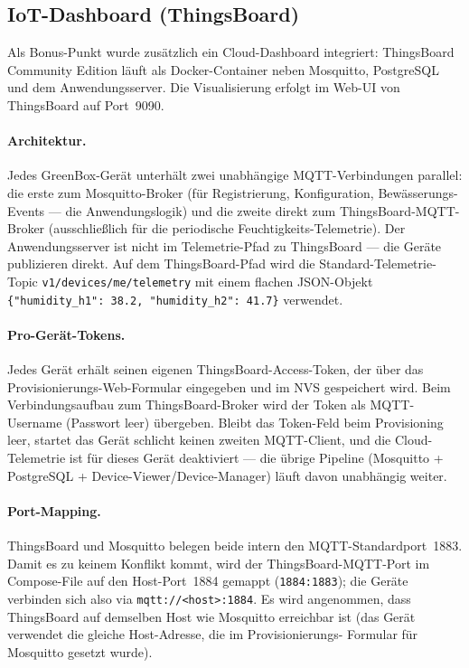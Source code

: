 \documentclass[a4paper,12pt]{article}
\begin{document}
\subsection{IoT-Dashboard (ThingsBoard)}

Als Bonus-Punkt wurde zusätzlich ein
Cloud-Dashboard integriert: ThingsBoard Community Edition läuft als
Docker-Container neben Mosquitto, PostgreSQL und dem
Anwendungsserver. Die Visualisierung erfolgt im Web-UI von
ThingsBoard auf Port~9090.

\paragraph{Architektur.} Jedes GreenBox-Gerät unterhält zwei
unabhängige MQTT-Verbindungen parallel: die erste zum
Mosquitto-Broker (für Registrierung, Konfiguration,
Bewässerungs-Events --- die Anwendungslogik) und die zweite direkt
zum ThingsBoard-MQTT-Broker (ausschließlich für die periodische
Feuchtigkeits-Telemetrie). Der Anwendungsserver ist nicht im
Telemetrie-Pfad zu ThingsBoard --- die Geräte publizieren direkt.
Auf dem ThingsBoard-Pfad wird die Standard-Telemetrie-Topic
\texttt{v1/devices/me/telemetry} mit einem flachen JSON-Objekt
\texttt{\{"humidity\_h1": 38.2, "humidity\_h2": 41.7\}} verwendet.

\paragraph{Pro-Gerät-Tokens.} Jedes Gerät erhält seinen eigenen
ThingsBoard-Access-Token, der über das
Provisionierungs-Web-Formular eingegeben und im NVS gespeichert
wird. Beim Verbindungsaufbau zum ThingsBoard-Broker wird der Token
als MQTT-Username (Passwort leer) übergeben. Bleibt das Token-Feld
beim Provisioning leer, startet das Gerät schlicht keinen zweiten
MQTT-Client, und die Cloud-Telemetrie ist für dieses Gerät
deaktiviert --- die übrige Pipeline (Mosquitto + PostgreSQL +
Device-Viewer/Device-Manager) läuft davon unabhängig weiter.

\paragraph{Port-Mapping.} ThingsBoard und Mosquitto belegen beide
intern den MQTT-Standardport~1883. Damit es zu keinem Konflikt
kommt, wird der ThingsBoard-MQTT-Port im Compose-File auf den
Host-Port~1884 gemappt (\texttt{1884:1883}); die Geräte verbinden
sich also via \texttt{mqtt://<host>:1884}. Es wird angenommen, dass
ThingsBoard auf demselben Host wie Mosquitto erreichbar ist (das
Gerät verwendet die gleiche Host-Adresse, die im Provisionierungs-
Formular für Mosquitto gesetzt wurde).
\end{document}
